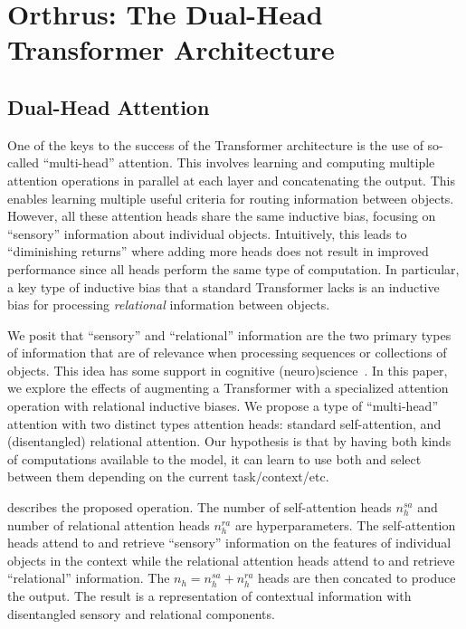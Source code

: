 \section{Orthrus: The Dual-Head Transformer Architecture}

\subsection{Dual-Head Attention}

One of the keys to the success of the Transformer architecture is the use of so-called ``multi-head'' attention. This involves learning and computing multiple attention operations in parallel at each layer and concatenating the output. This enables learning multiple useful criteria for routing information between objects. However, all these attention heads share the same inductive bias, focusing on ``sensory'' information about individual objects. Intuitively, this leads to ``diminishing returns'' where adding more heads does not result in improved performance since all heads perform the same type of computation. In particular, a key type of inductive bias that a standard Transformer lacks is an inductive bias for processing \textit{relational} information between objects.

We posit that ``sensory'' and ``relational'' information are the two primary types of information that are of relevance when processing sequences or collections of objects. This idea has some support  in cognitive (neuro)science~\citep{citation}. In this paper, we explore the effects of augmenting a Transformer with a specialized attention operation with relational inductive biases. We propose a type of ``multi-head'' attention with two distinct types attention heads: standard self-attention, and (disentangled) relational attention. Our hypothesis is that by having both kinds of computations available to the model, it can learn to use both and select between them depending on the current task/context/etc.

 describes the proposed operation. The number of self-attention heads $n_h^{sa}$ and number of relational attention heads $n_h^{ra}$ are hyperparameters. The self-attention heads attend to and retrieve ``sensory'' information on the features of individual objects in the context while the relational attention heads attend to and retrieve ``relational'' information. The $n_h = n_h^{sa} + n_h^{ra}$ heads are then concated to produce the output. The result is a representation of contextual information with disentangled sensory and relational components.

